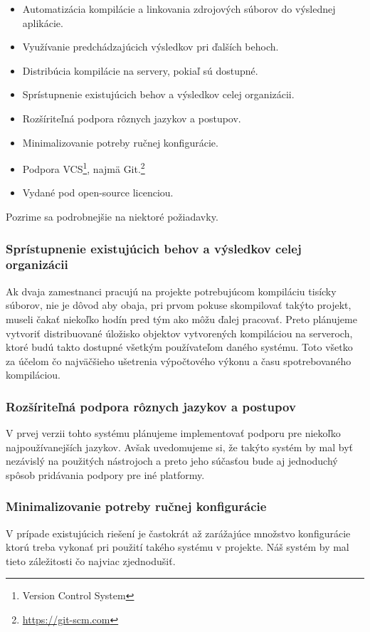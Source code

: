 \begin{itemize}
  \item Automatizácia kompilácie a linkovania zdrojových súborov do výslednej aplikácie.
  \item Využívanie predchádzajúcich výsledkov pri ďalších behoch.
  \item Distribúcia kompilácie na servery, pokiaľ sú dostupné.
  \item Sprístupnenie existujúcich behov a výsledkov celej organizácii.
  \item Rozšíriteľná podpora rôznych jazykov a postupov.
  \item Minimalizovanie potreby ručnej konfigurácie.
  \item Podpora VCS\footnote{Version Control System}, najmä Git.\footnote{\url{https://git-scm.com}}
  \item Vydané pod open-source licenciou.
\end{itemize}

Pozrime sa podrobnejšie na niektoré požiadavky.

\subsubsection{Sprístupnenie existujúcich behov a výsledkov celej organizácii}
Ak dvaja zamestnanci pracujú na projekte potrebujúcom kompiláciu tisícky súborov,
nie je dôvod aby obaja, pri prvom pokuse skompilovať takýto projekt, museli čakať
niekoľko hodín pred tým ako môžu ďalej pracovať. Preto plánujeme vytvoriť distribuované
úložisko objektov vytvorených kompiláciou na serveroch, ktoré budú takto dostupné
všetkým používateľom daného systému. Toto všetko za účelom čo najväčšieho ušetrenia
výpočtového výkonu a času spotrebovaného kompiláciou.

\subsubsection{Rozšíriteľná podpora rôznych jazykov a postupov}
V prvej verzii tohto systému plánujeme implementovať podporu pre niekoľko najpoužívanejších
jazykov. Avšak uvedomujeme si, že takýto systém by mal byť nezávislý na použitých
nástrojoch a preto jeho súčasťou bude aj jednoduchý spôsob pridávania podpory
pre iné platformy.

\subsubsection{Minimalizovanie potreby ručnej konfigurácie}
V prípade existujúcich riešení je častokrát až zarážajúce množstvo konfigurácie
ktorú treba vykonať pri použití takého systému v projekte. Náš systém by mal
tieto záležitosti čo najviac zjednodušiť.

